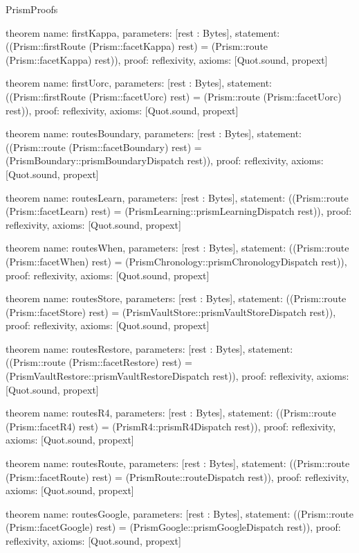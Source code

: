 \begin{lexlean}{PrismProofs}
\begin{semanticmodule}
theorem{
  name: firstKappa,
  parameters: [rest : Bytes],
  statement: ((Prism::firstRoute (Prism::facetKappa) rest) = (Prism::route (Prism::facetKappa) rest)),
  proof: reflexivity{},
  axioms: [Quot.sound, propext]
}

theorem{
  name: firstUorc,
  parameters: [rest : Bytes],
  statement: ((Prism::firstRoute (Prism::facetUorc) rest) = (Prism::route (Prism::facetUorc) rest)),
  proof: reflexivity{},
  axioms: [Quot.sound, propext]
}

theorem{
  name: routesBoundary,
  parameters: [rest : Bytes],
  statement: ((Prism::route (Prism::facetBoundary) rest) = (PrismBoundary::prismBoundaryDispatch rest)),
  proof: reflexivity{},
  axioms: [Quot.sound, propext]
}

theorem{
  name: routesLearn,
  parameters: [rest : Bytes],
  statement: ((Prism::route (Prism::facetLearn) rest) = (PrismLearning::prismLearningDispatch rest)),
  proof: reflexivity{},
  axioms: [Quot.sound, propext]
}

theorem{
  name: routesWhen,
  parameters: [rest : Bytes],
  statement: ((Prism::route (Prism::facetWhen) rest) = (PrismChronology::prismChronologyDispatch rest)),
  proof: reflexivity{},
  axioms: [Quot.sound, propext]
}

theorem{
  name: routesStore,
  parameters: [rest : Bytes],
  statement: ((Prism::route (Prism::facetStore) rest) = (PrismVaultStore::prismVaultStoreDispatch rest)),
  proof: reflexivity{},
  axioms: [Quot.sound, propext]
}

theorem{
  name: routesRestore,
  parameters: [rest : Bytes],
  statement: ((Prism::route (Prism::facetRestore) rest) = (PrismVaultRestore::prismVaultRestoreDispatch rest)),
  proof: reflexivity{},
  axioms: [Quot.sound, propext]
}

theorem{
  name: routesR4,
  parameters: [rest : Bytes],
  statement: ((Prism::route (Prism::facetR4) rest) = (PrismR4::prismR4Dispatch rest)),
  proof: reflexivity{},
  axioms: [Quot.sound, propext]
}

theorem{
  name: routesRoute,
  parameters: [rest : Bytes],
  statement: ((Prism::route (Prism::facetRoute) rest) = (PrismRoute::routeDispatch rest)),
  proof: reflexivity{},
  axioms: [Quot.sound, propext]
}

theorem{
  name: routesGoogle,
  parameters: [rest : Bytes],
  statement: ((Prism::route (Prism::facetGoogle) rest) = (PrismGoogle::prismGoogleDispatch rest)),
  proof: reflexivity{},
  axioms: [Quot.sound, propext]
}


\end{semanticmodule}
\end{lexlean}
